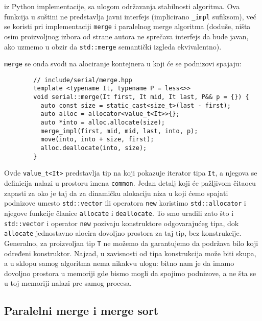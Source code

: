 \documentclass[a4paper,11pt]{article}
\begin{document}
    iz Python implementacije, sa ulogom održavanja stabilnosti algoritma. Ova funkcija u suštini ne predstavlja
    javni interfejs (implicirano \verb|_impl| sufiksom), već se koristi pri implementaciji \verb|merge| i paralelnog
    merge algoritma (doduše, ništa osim proizvoljnog izbora od strane autora ne sprečava interfejs da bude javan, ako
    uzmemo u obzir da \verb|std::merge| semantički izgleda ekvivalentno).\par
    \verb|merge| se onda svodi na alociranje kontejnera u koji će se podnizovi spajaju:
    \begin{verbatim}
        // include/serial/merge.hpp
        template <typename It, typename P = less<>>
        void serial::merge(It first, It mid, It last, P&& p = {}) {
          auto const size = static_cast<size_t>(last - first);
          auto alloc = allocator<value_t<It>>{};
          auto *into = alloc.allocate(size); 
          merge_impl(first, mid, mid, last, into, p);
          move(into, into + size, first);
          alloc.deallocate(into, size);
        }
    \end{verbatim}
    Ovde \verb|value_t<It>| predstavlja tip na koji pokazuje iterator tipa \verb|It|, a njegova se definicija
    nalazi u prostoru imena \verb|common|.
    Jedan detalj koji će pažljivom čitaocu zapasti za oko je taj da za dinamičku alokaciju niza u koji ćemo spajati podnizove umesto \verb|std::vector| ili operatora 
    \verb|new| koristimo \verb|std::allocator| i njegove funkcije članice \verb|allocate| i
    \verb|deallocate|. To smo uradili zato što i \verb|std::vector| i operator \verb|new|
    pozivaju konstruktore odgovarajućeg tipa, dok \verb|allocate| jednostavno alocira dovoljno
    prostora za taj tip, bez konstrukcije. Generalno, za proizvoljan tip \verb|T| ne možemo da garantujemo da
    podržava bilo koji određeni konstruktor. Najzad, u zavisnosti od tipa konstrukcija može biti skupa, a u sklopu
    samog algoritma nema nikakvu ulogu: bitno nam je da imamo dovoljno prostora u memoriji gde bismo mogli da spojimo
    podnizove, a ne šta se u toj memoriji nalazi pre samog procesa.
    
    \subsection{Paralelni merge i merge sort}
\end{document}
